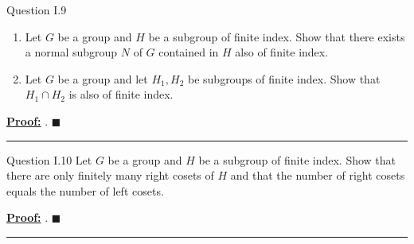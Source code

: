 \documentclass{article}
\newenvironment{proof}[1][Proof]{\par
\vspace{2mm}\noindent\textbf{\underline{#1:} }\rmfamily}{\hfill $\blacksquare$\par\vspace{2mm}}
\begin{document}
\begin{mathdefinitionbox}{Question I.9}
\vskip 0.5cm

\begin{enumerate}[label=(\alph*)]
  \item 
  Let $G$ be a group and $H$ be a subgroup of finite index. Show that there exists a normal subgroup $N$ of $G$ contained in $H$ also of finite index.
  \item Let $G$ be a group and let $H_1, H_2$ be subgroups of finite index. Show that $H_1 \cap H_2$ is also of finite index.
\end{enumerate}
\end{mathdefinitionbox}

\vskip 0.5cm
\begin{proof}
  .
\end{proof}

\vskip 0.5cm
\hrule 
\vskip 0.5cm



\begin{mathdefinitionbox}{Question I.10}
\vskip 0.5cm
Let $G$ be a group and $H$ be a subgroup of finite index. Show that there are only finitely many right cosets of $H$ and that the number of right cosets equals the number of left cosets.
\end{mathdefinitionbox}

\vskip 0.5cm
\begin{proof}
  .
\end{proof}

\vskip 0.5cm
\hrule 
\vskip 0.5cm








  

\end{document}
